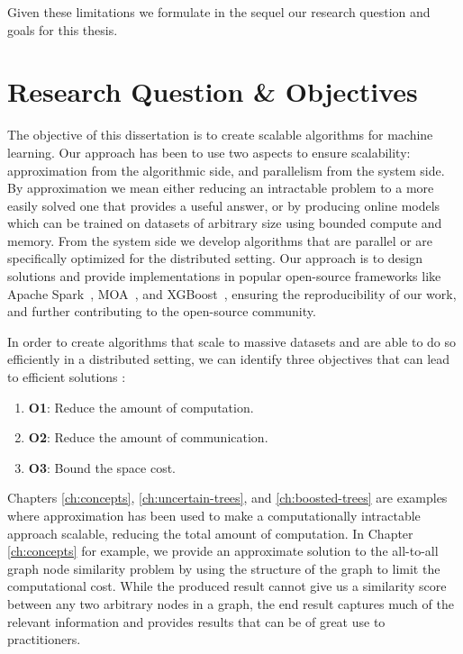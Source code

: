 Given these limitations we formulate in the sequel our research question and goals for
this thesis.

\section{Research Question \& Objectives}
\label{sec:intro-question-objectives}

The objective of this dissertation is to create scalable algorithms for machine
learning. Our approach has been to use two aspects to ensure scalability:
approximation from the algorithmic side, and parallelism from the system
side. By approximation we mean either reducing an intractable problem
to a more easily solved one that provides a useful answer, or by producing
online models which can be trained on datasets of arbitrary size using bounded
compute and memory. From the system side we develop algorithms that are parallel
or are specifically optimized for the distributed setting.
Our approach is to design solutions and provide implementations
in popular open-source frameworks like Apache Spark~\cite{spark},
MOA~\cite{samoa}, and XGBoost~\cite{xgboost}, ensuring the reproducibility
of our work, and further contributing to the open-source community.

In order to create algorithms that scale to massive datasets and are able to
do so efficiently in a distributed setting, we can identify three objectives that can
lead to efficient solutions \cite{vasia-thesis}:

\begin{enumerate}
	\item \textbf{O1}: Reduce the amount of computation.
	\item \textbf{O2}: Reduce the amount of communication.
	\item \textbf{O3}: Bound the space cost.
\end{enumerate}

Chapters \ref{ch:concepts}, \ref{ch:uncertain-trees}, and \ref{ch:boosted-trees}
are examples where approximation has been used to make a computationally intractable
approach scalable, reducing the total amount of computation.
In Chapter \ref{ch:concepts} for example, we provide an approximate solution
to the all-to-all graph node similarity problem by using the structure of the
graph to limit the computational cost. While the produced result cannot give
us a similarity score between any two arbitrary nodes in a graph, the end result captures
much of the relevant information and provides results that can be of great use
to practitioners.

